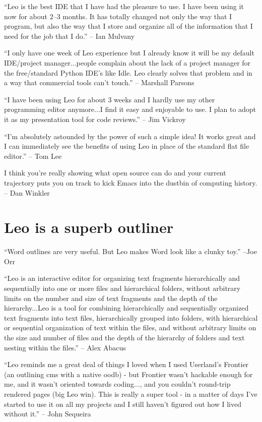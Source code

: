 \documentclass[a4paper,10pt,english]{sphinxmanual}
\begin{document}
``Leo is the best IDE that I have had the pleasure to use. I have been using it
now for about 2--3 months. It has totally changed not only the way that I
program, but also the way that I store and organize all of the information that
I need for the job that I do.'' -- Ian Mulvany

``I only have one week of Leo experience but I already know it will be my default
IDE/project manager...people complain about the lack of a project manager for
the free/standard Python IDE's like Idle. Leo clearly solves that problem and in
a way that commercial tools can't touch.'' -- Marshall Parsons

``I have been using Leo for about 3 weeks and I hardly use my other programming
editor anymore...I find it easy and enjoyable to use. I plan to adopt it as my
presentation tool for code reviews.'' -- Jim Vickroy

``I'm absolutely astounded by the power of such a simple idea! It works great and
I can immediately see the benefits of using Leo in place of the standard flat
file editor.'' -- Tom Lee

I think you're really showing what open source can do and your current
trajectory puts you on track to kick Emacs into the dustbin of computing
history. -- Dan Winkler


\section{Leo is a superb outliner}
\label{testimonials:leo-is-a-superb-outliner}
``Word outlines are very useful. But Leo makes Word look like a clunky toy.''
--Joe Orr

``Leo is an interactive editor for organizing text fragments hierarchically and
sequentially into one or more files and hierarchical folders, without arbitrary
limits on the number and size of text fragments and the depth of the
hierarchy...Leo is a tool for combining hierarchically and sequentially
organized text fragments into text files, hierarchically grouped into folders,
with hierarchical or sequential organization of text within the files, and
without arbitrary limits on the size and number of files and the depth of the
hierarchy of folders and text nesting within the files.'' -- Alex Abacus

``Leo reminds me a great deal of things I loved when I used Userland's Frontier
(an outlining cms with a native oodb) - but Frontier wasn't hackable enough for
me, and it wasn't oriented towards coding..., and you couldn't round-trip
rendered pages (big Leo win). This is really a super tool - in a matter of days
I've started to use it on all my projects and I still haven't figured out how I
lived without it.'' -- John Sequeira
\end{document}
